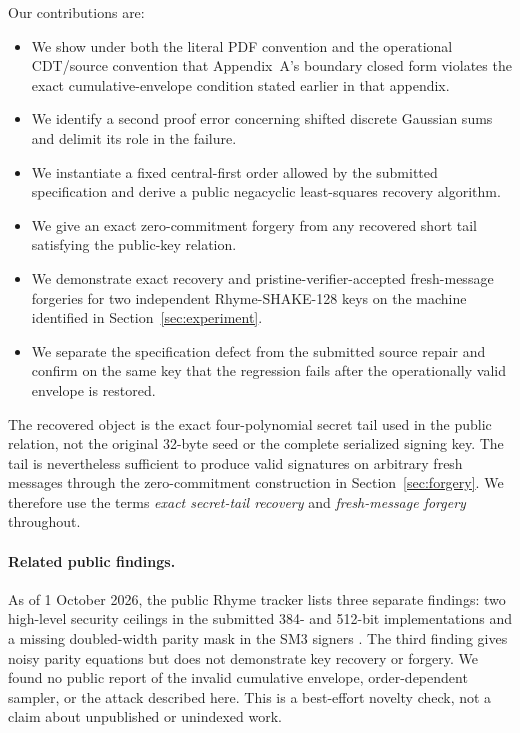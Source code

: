 \documentclass[11pt,a4paper]{article}
\begin{document}
Our contributions are:
\begin{itemize}[leftmargin=1.5em]
  \item We show under both the literal PDF convention and the operational
        CDT/source convention that Appendix~A's boundary closed form violates
        the exact cumulative-envelope condition stated earlier in that
        appendix.
  \item We identify a second proof error concerning shifted discrete Gaussian
        sums and delimit its role in the failure.
  \item We instantiate a fixed central-first order allowed by the submitted
        specification and derive a public negacyclic least-squares recovery
        algorithm.
  \item We give an exact zero-commitment forgery from any recovered short tail
        satisfying the public-key relation.
  \item We demonstrate exact recovery and pristine-verifier-accepted
        fresh-message forgeries for two independent Rhyme-SHAKE-128 keys on
        the machine identified in Section~\ref{sec:experiment}.
  \item We separate the specification defect from the submitted source repair
        and confirm on the same key that the regression fails after the
        operationally valid envelope is restored.
\end{itemize}

The recovered object is the exact four-polynomial secret tail used in the
public relation, not the original 32-byte seed or the complete serialized
signing key.  The tail is nevertheless sufficient to produce valid signatures
on arbitrary fresh messages through the zero-commitment construction in
Section~\ref{sec:forgery}.  We therefore use the terms \emph{exact
secret-tail recovery} and \emph{fresh-message forgery} throughout.

\paragraph{Related public findings.}
As of 1 October 2026, the public Rhyme tracker lists three separate
findings: two high-level security ceilings in the submitted 384- and 512-bit
implementations and a missing doubled-width parity mask in the SM3 signers
\cite{ngcc-rhyme}.  The third finding gives noisy parity equations but does
not demonstrate key recovery or forgery.  We found no public report of the
invalid cumulative envelope, order-dependent sampler, or the attack described
here.  This is a best-effort novelty check, not a claim about unpublished or
unindexed work.
\end{document}
